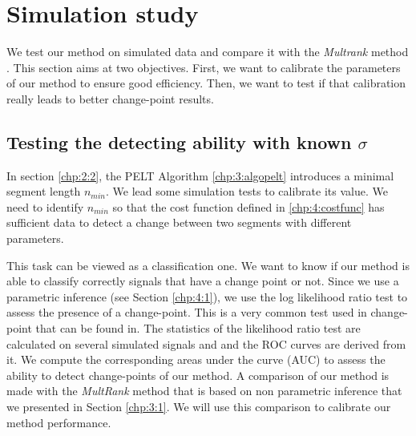 
\section{Simulation study}\label{chp:4:4}

We test our method on simulated data and compare it with the \textit{Multrank} method \cite{lung2015}. This section aims at two objectives. First, we want to calibrate the parameters of our method to ensure good efficiency. Then, we want to test if that calibration really leads to better change-point results.  

\subsection{Testing the detecting ability with known $\sigma$}

In section \ref{chp:2:2}, the PELT Algorithm \ref{chp:3:algopelt} introduces a minimal segment length $n_{min}$. We lead some simulation tests to calibrate its value. We need to identify $n_{min}$ so that the cost function defined in \ref{chp:4:costfunc} has sufficient data to detect a change between two segments with different parameters.

This task can be viewed as a classification one. We want to know if our method is able to classify correctly signals that have a change point or not. Since we use a parametric inference (see Section \ref{chp:4:1}), we use the log likelihood ratio test to assess the presence of a change-point. This is a very common test used in change-point that can be found in. The statistics of the likelihood ratio test are calculated on several simulated signals and and the ROC curves \citep{Fawcett2006} are derived from it. We compute the corresponding areas under the curve (AUC) to assess the ability to detect change-points of our method. A comparison of our method is made with the \textit{MultRank} method that is based on non parametric inference that we presented in Section \ref{chp:3:1}. We will use this comparison to calibrate our method performance.  

